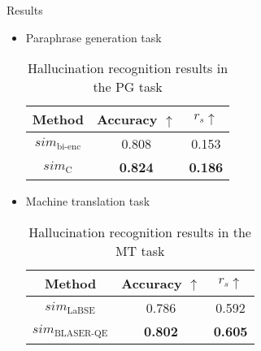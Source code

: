 \documentclass{beamer}
\begin{document}
\begin{frame}{Results}

\begin{itemize}
    \item Paraphrase generation task\\
    \begin{table}[]
        \centering
        \begin{tabular}{c|c c}
        Method & Accuracy $\uparrow$ & $r_s \uparrow$ \\
        \hline
        $sim_\text{bi-enc}$ & 0.808 & 0.153 \\
        $sim_\text{C}$ & \textbf{0.824} & \textbf{0.186} \\
        \end{tabular}
        \caption{Hallucination recognition results in the PG task}
        \label{tab:pg}
    \end{table}
    \item Machine translation task\\

    \begin{table}[]
    \centering
    \begin{tabular}{c|c c}
    Method & Accuracy $\uparrow$ & $r_s \uparrow$ \\
    \hline
    $sim_\text{LaBSE}$ & 0.786 & 0.592 \\
    $sim_\text{BLASER-QE}$ & \textbf{0.802} & \textbf{0.605} \\
    \end{tabular}
    \caption{Hallucination recognition results in the MT task}
    \label{tab:mt}
    \end{table}

\end{itemize}


\end{frame}
\end{document}
